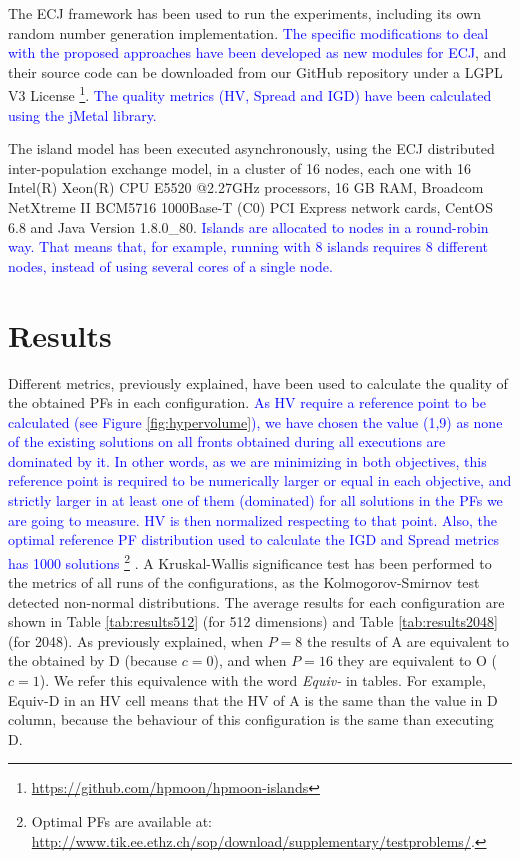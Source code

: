 \documentclass[preprint]{elsarticle}
\begin{document}
The ECJ framework \citep{ECJ} has been used to run the
experiments, including its own random number generation implementation.  \textcolor{blue}{The specific modifications to deal with the proposed approaches have been developed as new modules for
ECJ}, and their source code can be downloaded from our GitHub repository under a
LGPL V3 License
\footnote{\url{https://github.com/hpmoon/hpmoon-islands}}. \textcolor{blue}{The quality metrics (HV, Spread and IGD) have been calculated using the jMetal \cite{Durillo11Jmetal} library.}

The
island model has been executed asynchronously, using the ECJ distributed inter-population exchange
 model, in a cluster of 16 nodes, each one with 16 Intel(R) Xeon(R) CPU E5520
@2.27GHz processors, 16 GB RAM, Broadcom NetXtreme II BCM5716 1000Base-T (C0) PCI Express network cards, CentOS 6.8 and Java Version 1.8.0\_80. \textcolor{blue}{Islands are allocated to nodes in a round-robin way. That means that, for example, running with 8 islands requires 8 different nodes, instead of using several cores of a single node.}

\section{Results}
\label{sec:results}


Different metrics, previously explained, have been used
to calculate the quality of the obtained PFs in each configuration. \textcolor{blue}{As HV require a reference point to be
calculated (see Figure \ref{fig:hypervolume}), we have chosen the value (1,9) as none of the existing solutions on all fronts obtained during all executions are dominated by it. In other words, as we are minimizing in both objectives, this reference point is required to be numerically larger or equal in each objective, and strictly larger in at least one of them (dominated) for all solutions in the PFs we are going to measure. HV is then
normalized respecting to that point. Also, the optimal reference PF distribution used to calculate the IGD and Spread metrics \cite{Durillo11Jmetal} has 1000 solutions \footnote{Optimal PFs are available at:   \url{http://www.tik.ee.ethz.ch/sop/download/supplementary/testproblems/}.} }.  
A Kruskal-Wallis significance
test has been performed to the metrics of all runs of the
configurations, as the Kolmogorov-Smirnov test detected non-normal
distributions. The average results for each configuration are shown in
Table \ref{tab:results512} (for 512 dimensions) and Table
\ref{tab:results2048} (for 2048). As previously explained, when $P=8$
the results of A are equivalent to the obtained by D (because
$c=0$), and when $P=16$ they are equivalent to O ($c=1$). We refer this equivalence with the word {\em Equiv-} in tables. For example, Equiv-D in an HV cell  means that the HV of A is the same than the value in D column, because the behaviour of this configuration is the same than executing D.
\end{document}
